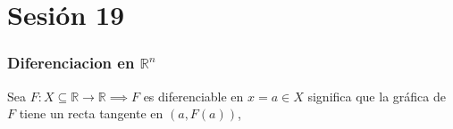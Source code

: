 \section{Sesión 19}

\subsubsection{Diferenciacion en $\mathbb{R}^n$}

Sea $F:X\subseteq \mathbb{R}\to\mathbb{R}\implies F$ es diferenciable en $x=a\in X$ significa que la gráfica de $F$ tiene un recta tangente en $(a,F(a))$,  



